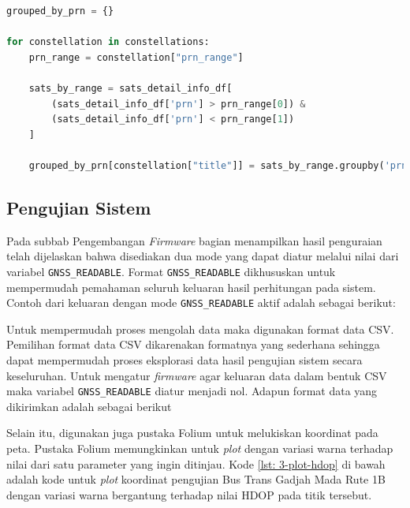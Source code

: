 \vspace{0.3cm}
\begin{lstlisting}[language=python, style=mystyle, caption={Mengelompokan Satelit Berdasarkan PRN-nya pada Python}, label={lst: 3-sats-prn}]
grouped_by_prn = {}

for constellation in constellations:
	prn_range = constellation["prn_range"]
	
	sats_by_range = sats_detail_info_df[
		(sats_detail_info_df['prn'] > prn_range[0]) & 
		(sats_detail_info_df['prn'] < prn_range[1])
	]
	
	grouped_by_prn[constellation["title"]] = sats_by_range.groupby('prn')['snr'].agg(['mean', 'median', 'std'])
\end{lstlisting}
\fi

\subsection{Pengujian Sistem}
Pada subbab Pengembangan \textit{Firmware} bagian menampilkan hasil penguraian telah dijelaskan bahwa disediakan dua mode yang dapat diatur melalui nilai dari variabel \texttt{GNSS\_READABLE}. Format \texttt{GNSS\_READABLE} dikhususkan untuk mempermudah pemahaman seluruh keluaran hasil perhitungan pada sistem. Contoh dari keluaran dengan mode \texttt{GNSS\_READABLE} aktif adalah sebagai berikut:

Untuk mempermudah proses mengolah data maka digunakan format data CSV. Pemilihan format data CSV dikarenakan formatnya yang sederhana sehingga dapat mempermudah proses eksplorasi data hasil pengujian sistem secara keseluruhan. Untuk mengatur \textit{firmware} agar keluaran data dalam bentuk CSV maka variabel \texttt{GNSS\_READABLE} diatur menjadi nol. Adapun format data yang dikirimkan adalah sebagai berikut

Selain itu, digunakan juga pustaka Folium untuk melukiskan koordinat pada peta. Pustaka Folium memungkinkan untuk \textit{plot} dengan variasi warna terhadap nilai dari satu parameter yang ingin ditinjau. Kode \ref{lst: 3-plot-hdop} di bawah adalah kode untuk \textit{plot} koordinat pengujian Bus Trans Gadjah Mada Rute 1B dengan variasi warna bergantung terhadap nilai HDOP pada titik tersebut.

